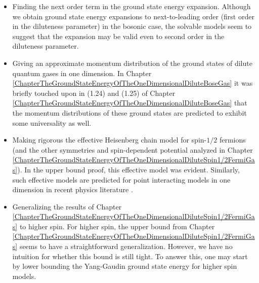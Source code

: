 \begin{itemize}
	\item Finding the next order term in the ground state energy expansion. Although we obtain ground state energy expansions to next-to-leading order (first order in the diluteness parameter) in the bosonic case, the solvable models seem to suggest that the expansion may be valid even to second order in the diluteness parameter.
	\item Giving an approximate momentum distribution of the ground states of dilute quantum gases in one dimension. In Chapter \ref{ChapterTheGroundStateEnergyOfTheOneDimensionalDiluteBoseGas} it was briefly touched upon in (1.24) and (1.25) of Chapter \ref{ChapterTheGroundStateEnergyOfTheOneDimensionalDiluteBoseGas} that the momentum distributions of these ground states are predicted to exhibit some universality as well.
	\item Making rigorous the effective Heisenberg chain model for spin-$ 1/2$ fermions (and the other symmetries and spin-dependent potential analyzed in Chapter \ref{ChapterTheGroundStateEnergyOfTheOneDimensionalDiluteSpin1/2FermiGas}). In the upper bound proof, this effective model was evident. Similarly, such effective models are predicted for point interacting models in one dimension in recent physics literature \cite{yang2016effective,volosniev2015engineering}.
	\item Generalizing the results of Chapter \ref{ChapterTheGroundStateEnergyOfTheOneDimensionalDiluteSpin1/2FermiGas} to higher spin. For higher spin, the upper bound from Chapter \ref{ChapterTheGroundStateEnergyOfTheOneDimensionalDiluteSpin1/2FermiGas} seems to have a straightforward generalization. However, we have no intuition for whether this bound is still tight. To answer this, one may start by lower bounding the Yang-Gaudin ground state energy for higher spin models.
\end{itemize}



